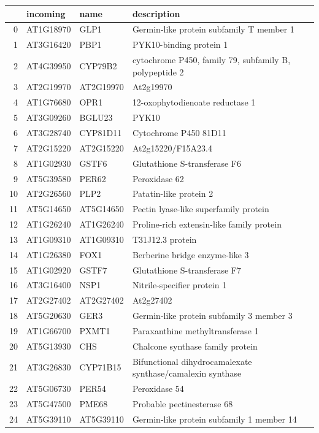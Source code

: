 \documentclass[11pt]{article}
\begin{document}
\begin{center}
\begin{tabular}{rlll}
 & incoming & name & description\\
\hline
0 & AT1G18970 & GLP1 & Germin-like protein subfamily T member 1\\
1 & AT3G16420 & PBP1 & PYK10-binding protein 1\\
2 & AT4G39950 & CYP79B2 & cytochrome P450, family 79, subfamily B, polypeptide 2\\
3 & AT2G19970 & AT2G19970 & At2g19970\\
4 & AT1G76680 & OPR1 & 12-oxophytodienoate reductase 1\\
5 & AT3G09260 & BGLU23 & PYK10\\
6 & AT3G28740 & CYP81D11 & Cytochrome P450 81D11\\
7 & AT2G15220 & AT2G15220 & At2g15220/F15A23.4\\
8 & AT1G02930 & GSTF6 & Glutathione S-transferase F6\\
9 & AT5G39580 & PER62 & Peroxidase 62\\
10 & AT2G26560 & PLP2 & Patatin-like protein 2\\
11 & AT5G14650 & AT5G14650 & Pectin lyase-like superfamily protein\\
12 & AT1G26240 & AT1G26240 & Proline-rich extensin-like family protein\\
13 & AT1G09310 & AT1G09310 & T31J12.3 protein\\
14 & AT1G26380 & FOX1 & Berberine bridge enzyme-like 3\\
15 & AT1G02920 & GSTF7 & Glutathione S-transferase F7\\
16 & AT3G16400 & NSP1 & Nitrile-specifier protein 1\\
17 & AT2G27402 & AT2G27402 & At2g27402\\
18 & AT5G20630 & GER3 & Germin-like protein subfamily 3 member 3\\
19 & AT1G66700 & PXMT1 & Paraxanthine methyltransferase 1\\
20 & AT5G13930 & CHS & Chalcone synthase family protein\\
21 & AT3G26830 & CYP71B15 & Bifunctional dihydrocamalexate synthase/camalexin synthase\\
22 & AT5G06730 & PER54 & Peroxidase 54\\
23 & AT5G47500 & PME68 & Probable pectinesterase 68\\
24 & AT5G39110 & AT5G39110 & Germin-like protein subfamily 1 member 14\\
\end{tabular}
\end{center}
\end{document}
